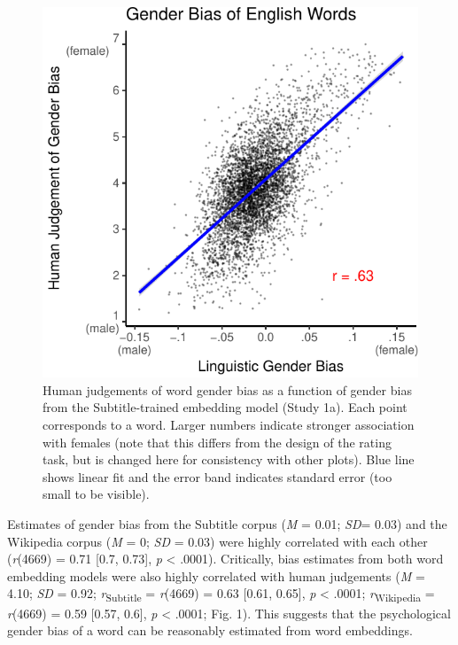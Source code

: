 \documentclass[man,floatsintext]{apa6}
\begin{document}
\begin{figure}
\centering
\includegraphics{iat_lang_files/figure-latex/unnamed-chunk-10-1.pdf}
\caption{\label{fig:unnamed-chunk-10}Human judgements of word gender bias as a function of gender bias from the Subtitle-trained embedding model (Study 1a). Each point corresponds to a word. Larger numbers indicate stronger association with females (note that this differs from the design of the rating task, but is changed here for consistency with other plots). Blue line shows linear fit and the error band indicates standard error (too small to be visible).}
\end{figure}

Estimates of gender bias from the Subtitle corpus (\emph{M} = 0.01; \emph{SD}= 0.03) and the Wikipedia corpus (\emph{M} = 0; \emph{SD} = 0.03) were highly correlated with each other (\emph{r}(4669) = 0.71 {[}0.7, 0.73{]}, \emph{p} \textless{} .0001). Critically, bias estimates from both word embedding models were also highly correlated with human judgements (\emph{M} = 4.10; \emph{SD} = 0.92; \emph{r}\textsubscript{Subtitle} = \emph{r}(4669) = 0.63 {[}0.61, 0.65{]}, \emph{p} \textless{} .0001; \emph{r}\textsubscript{Wikipedia} = \emph{r}(4669) = 0.59 {[}0.57, 0.6{]}, \emph{p} \textless{} .0001; Fig. 1). This suggests that the psychological gender bias of a word can be reasonably estimated from word embeddings.
\end{document}
